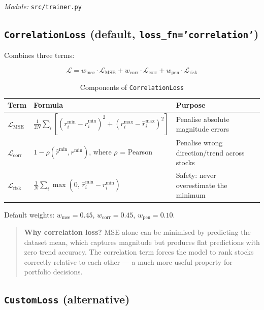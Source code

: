 \documentclass[12pt,a4paper]{article}
\newcommand{\codeinline}[1]{\texttt{\small #1}}
\begin{document}
\textit{Module:} \codeinline{src/trainer.py}

\subsection{\texttt{CorrelationLoss} (default, \texttt{loss\_fn='correlation'})}

Combines three terms:

\begin{equation}
  \mathcal{L} = w_{\text{mse}} \cdot \mathcal{L}_{\text{MSE}} + w_{\text{corr}} \cdot \mathcal{L}_{\text{corr}} + w_{\text{pen}} \cdot \mathcal{L}_{\text{risk}}
\end{equation}

\begin{table}[H]
\centering
\begin{tabular}{L{2cm} L{6cm} L{5cm}}
\toprule
\textbf{Term} & \textbf{Formula} & \textbf{Purpose} \\
\midrule
$\mathcal{L}_{\text{MSE}}$ &
  $\frac{1}{2N}\sum_i \!\left[(r^{\min}_i - \hat{r}^{\min}_i)^2 + (r^{\max}_i - \hat{r}^{\max}_i)^2\right]$ &
  Penalise absolute magnitude errors \\[0.5em]
$\mathcal{L}_{\text{corr}}$ &
  $1 - \rho(\hat{r}^{\min}, r^{\min})$, where $\rho$ = Pearson &
  Penalise wrong direction/trend across stocks \\[0.5em]
$\mathcal{L}_{\text{risk}}$ &
  $\frac{1}{N}\sum_i \max(0,\, \hat{r}^{\min}_i - r^{\min}_i)$ &
  Safety: never overestimate the minimum \\
\bottomrule
\end{tabular}
\caption{Components of \texttt{CorrelationLoss}}
\end{table}

Default weights: $w_{\text{mse}} = 0.45$, $w_{\text{corr}} = 0.45$, $w_{\text{pen}} = 0.10$.

\begin{quote}
\textbf{Why correlation loss?} MSE alone can be minimised by predicting the dataset mean, which captures magnitude but produces flat predictions with zero trend accuracy. The correlation term forces the model to rank stocks correctly relative to each other — a much more useful property for portfolio decisions.
\end{quote}

\subsection{\texttt{CustomLoss} (alternative)}
\end{document}
